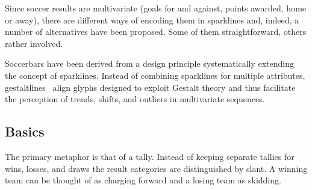 \documentclass[a4paper,12pt]{ltxdoc}
\begin{document}
Since soccer results are multivariate
(goals for and against, points awarded, home or away), 
there are different ways of encoding them in sparklines
and, indeed, a number of alternatives have been proposed.
Some of them straightforward, others rather involved.

Soccerbars have been derived from a design principle
systematically extending the concept of sparklines. 
Instead of combining sparklines for multiple attributes,
gestaltlines~\cite{gestaltlines,gestaltmatrix} align glyphs
designed to exploit Gestalt theory 
and thus facilitate the perception of
trends, shifts, and outliers in multivariate sequences.


\subsection{Basics}

The primary metaphor is that of a tally.
Instead of keeping separate tallies for wins, losses, and draws 
the result categories are distinguished by slant. 
A winning team can be thought of as charging forward
and a losing team as skidding.
\end{document}
